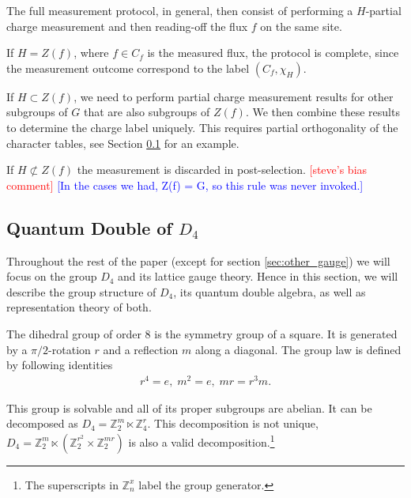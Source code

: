 \documentclass[two column]{article}
\newcommand{\caro}[1]{\textcolor{red}{[#1]}}
\newcommand{\jovan}[1]{\textcolor{blue}{[#1]}}
\begin{document}
The full measurement protocol, in general, then consist of performing a $H$-partial charge measurement and then reading-off the flux $f$ on the same site. 

If $H = Z(f)$, where $f \in C_f$ is the measured flux, the protocol is complete, since the measurement outcome correspond to the label $(C_f, \chi_H)$.

If $H \subset Z(f)$, we need to perform partial charge measurement results for other subgroups of $G$ that are also subgroups of $Z(f)$. We then combine these results to determine the charge label uniquely. This requires partial orthogonality of the character tables, see Section \ref{sec:D4_double} for an example.

If $H \not\subset Z(f)$ the measurement is discarded in post-selection.
\caro{steve's bias comment}
\jovan{In the cases we had, Z(f) = G, so this rule was never invoked.}

\subsection{Quantum Double of $D_4$}\label{sec:D4_double}

Throughout the rest of the paper (except for section \ref{sec:other_gauge}) we will focus on the group $D_4$ and its lattice gauge theory.
Hence in this section, we will describe the group structure of $D_4$, its quantum double algebra, as well as representation theory of both.

The dihedral group of order 8 is the symmetry group of a square. It is generated by a $\pi/2$-rotation $r$ and a reflection  $m$ along a diagonal.
The group law is defined by following identities
\begin{equation}
	\begin{split}
		r^4 = e,\;
		m^2 = e,	\;	mr = r^3m. \label{eqn:group}
	\end{split}
\end{equation}

This group is solvable and all of its proper subgroups are abelian. It can be decomposed as $D_4 = \mathbb{Z}^m_2 \ltimes \mathbb{Z}^r_4$.
This decomposition is not unique, $D_4 = \mathbb{Z}_2^m\ltimes(\mathbb{Z}_2^{r^2}\times\mathbb{Z}^{mr}_2)$ is also a valid decomposition.\footnote{The superscripts in $\mathbb{Z}_n^x$ label the group generator.}
\end{document}
